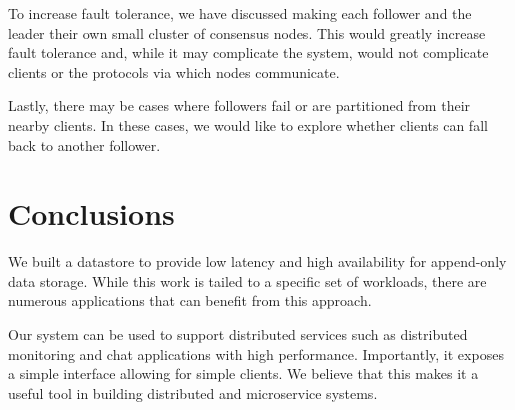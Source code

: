\documentclass[11pt,english,twocolumn]{article}
\begin{document}
To increase fault tolerance, we have discussed making each follower and the
leader their own small cluster of consensus nodes. This would greatly increase
fault tolerance and, while it may complicate the system, would not complicate
clients or the protocols via which nodes communicate.

Lastly, there may be cases where followers fail or are partitioned from their
nearby clients. In these cases, we would like to explore whether clients can
fall back to another follower.

\section{Conclusions}
We built a datastore to provide low latency and high availability for append-only
data storage. While this work is tailed to a specific set of workloads, there
are numerous applications that can benefit from this approach.

Our system can be used to support distributed services such as distributed
monitoring and chat applications with high performance. Importantly, it exposes
a simple interface allowing for simple clients. We believe that this makes it a
useful tool in building distributed and microservice systems.

 

\end{document}
